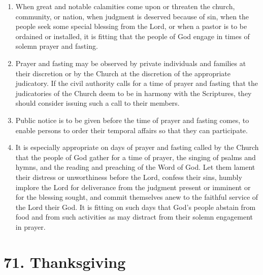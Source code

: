 \documentclass[
]{book}
\providecommand{\tightlist}{%
  \setlength{\itemsep}{0pt}\setlength{\parskip}{0pt}}
\begin{document}
\begin{enumerate}
\def\labelenumi{\arabic{enumi}.}
\tightlist
\item
  \protect\hypertarget{70}{\href{}{}}When great and notable calamities come upon or threaten the church, community, or nation, when judgment is deserved because of sin, when the people seek some special blessing from the Lord, or when a pastor is to be ordained or installed, it is fitting that the people of God engage in times of solemn prayer and fasting.
\item
  Prayer and fasting may be observed by private individuals and families at their discretion or by the Church at the discretion of the appropriate judicatory. If the civil authority calls for a time of prayer and fasting that the judicatories of the Church deem to be in harmony with the Scriptures, they should consider issuing such a call to their members.
\item
  Public notice is to be given before the time of prayer and fasting comes, to enable persons to order their temporal affairs so that they can participate.
\item
  It is especially appropriate on days of prayer and fasting called by the Church that the people of God gather for a time of prayer, the singing of psalms and hymns, and the reading and preaching of the Word of God. Let them lament their distress or unworthiness before the Lord, confess their sins, humbly implore the Lord for deliverance from the judgment present or imminent or for the blessing sought, and commit themselves anew to the faithful service of the Lord their God. It is fitting on such days that God's people abstain from food and from such activities as may distract from their solemn engagement in prayer.
\end{enumerate}

\hypertarget{thanksgiving}{%
\section*{71. Thanksgiving}\label{thanksgiving}}

\protect\hypertarget{chapter-slug-71-thanksgiving}{\href{}{}}
\end{document}

